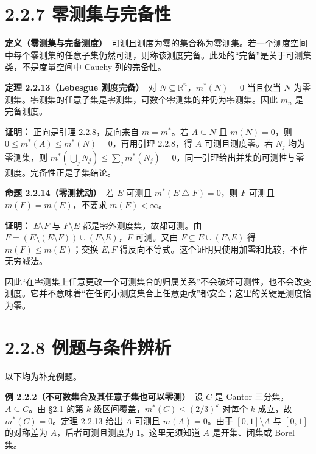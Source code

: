 \documentclass[11pt,a4paper]{article}
\begin{document}
\section[\S{}2.2.7
零测集与完备性]{2.2.7
零测集与完备性}\label{ux96f6ux6d4bux96c6ux4e0eux5b8cux5907ux6027}

\textbf{定义（零测集与完备测度）}　可测且测度为零的集合称为零测集。若一个测度空间中每个零测集的任意子集仍然可测，则称该测度完备。此处的``完备''是关于可测集类，不是度量空间中
Cauchy 列的完备性。

\textbf{定理 2.2.13（Lebesgue 测度完备）}　对
\(N\subseteq\mathbb R^n\)，\(m^*(N)=0\) 当且仅当 \(N\)
为零测集。零测集的任意子集是零测集，可数个零测集的并仍为零测集。因此
\(m_n\) 是完备测度。

\textbf{证明：} 正向是引理 2.2.8，反向来自 \(m=m^*\)。若
\(A\subseteq N\) 且 \(m(N)=0\)，则 \(0\le m^*(A)\le m^*(N)=0\)，再用引理
2.2.8，得 \(A\) 可测且测度零。若 \(N_j\) 均为零测集，则
\(m^*(\bigcup_jN_j)\le\sum_jm^*(N_j)=0\)，同一引理给出并集的可测性与零测度。完备性正是子集结论。

\textbf{命题 2.2.14（零测扰动）}　若 \(E\) 可测且
\(m^*(E\mathbin{\triangle}F)=0\)，则 \(F\) 可测且 \(m(F)=m(E)\)，不要求
\(m(E)<\infty\)。

\textbf{证明：} \(E\setminus F\) 与 \(F\setminus E\)
都是零外测度集，故都可测。由
\(F=(E\setminus(E\setminus F))\cup(F\setminus E)\)，\(F\) 可测。又由
\(F\subseteq E\cup(F\setminus E)\) 得 \(m(F)\le m(E)\)；交换 \(E,F\)
得反向不等式。这个证明只使用加零和比较，不作无穷减法。

因此``在零测集上任意更改一个可测集合的归属关系''不会破坏可测性，也不会改变测度。它并不意味着``在任何小测度集合上任意更改''都安全；这里的关键是测度恰为零。

\section[\S{}2.2.8
例题与条件辨析]{2.2.8
例题与条件辨析}\label{ux4f8bux9898ux4e0eux6761ux4ef6ux8fa8ux6790}

以下均为补充例题。

\textbf{例 2.2.2（不可数集合及其任意子集也可以零测）}　设 \(C\) 是
Cantor 三分集，\(A\subseteq C\)。由 §2.1 的第 \(k\)
级区间覆盖，\(m^*(C)\le(2/3)^k\) 对每个 \(k\) 成立，故
\(m^*(C)=0\)。定理 2.2.13 给出 \(A\) 可测且 \(m(A)=0\)。由于
\([0,1]\setminus A\) 与 \([0,1]\) 的对称差为 \(A\)，后者可测且测度为
\(1\)。这里无须知道 \(A\) 是开集、闭集或 Borel 集。
\end{document}
